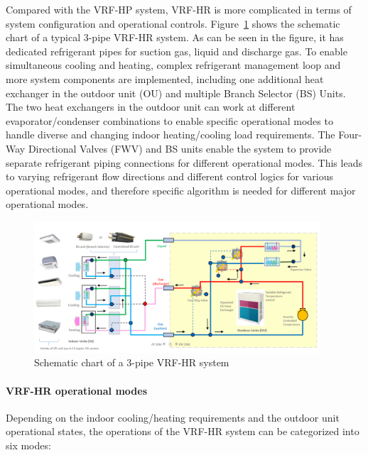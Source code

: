 Compared with the VRF-HP system, VRF-HR is more complicated in terms of system configuration and operational controls. Figure~\ref{fig:VRF-HR-Chart-Schematic} shows the schematic chart of a typical 3-pipe VRF-HR system. As can be seen in the figure, it has dedicated refrigerant pipes for suction gas, liquid and discharge gas. To enable simultaneous cooling and heating, complex refrigerant management loop and more system components are implemented, including one additional heat exchanger in the outdoor unit (OU) and multiple Branch Selector (BS) Units. The two heat exchangers in the outdoor unit can work at different evaporator/condenser combinations to enable specific operational modes to handle diverse and changing indoor heating/cooling load requirements. The Four-Way Directional Valves (FWV) and BS units enable the system to provide separate refrigerant piping connections for different operational modes. This leads to varying refrigerant flow directions and different control logics for various operational modes, and therefore specific algorithm is needed for different major operational modes.

\begin{figure}[hbtp] %
\centering
\includegraphics[width=0.95\textwidth, height=0.95\textheight, keepaspectratio=true]{media/VRF-HR-Chart-Schematic.png}
\caption{Schematic chart of a 3-pipe VRF-HR system \label{fig:VRF-HR-Chart-Schematic}}
\end{figure}


\paragraph{VRF-HR operational modes}\label{VRF-HR-operational-modes}

Depending on the indoor cooling/heating requirements and the outdoor unit operational states, the operations of the VRF-HR system can be categorized into six modes:

